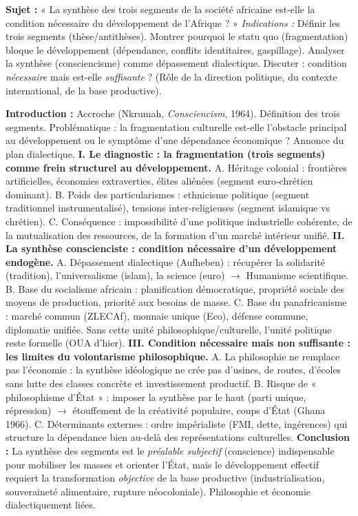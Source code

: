 \documentclass[11pt]{article}
\begin{document}
\begin{exercice}
\textbf{Sujet :} « La synthèse des trois segments de la société africaine est-elle la condition nécessaire du développement de l'Afrique ? »
\textit{Indications :} Définir les trois segments (thèse/antithèses). Montrer pourquoi le statu quo (fragmentation) bloque le développement (dépendance, conflits identitaires, gaspillage). Analyser la synthèse (consciencisme) comme dépassement dialectique. Discuter : condition \emph{nécessaire} mais est-elle \emph{suffisante} ? (Rôle de la direction politique, du contexte international, de la base productive).
\end{exercice}

\begin{corrige}
\textbf{Introduction :} Accroche (Nkrumah, \emph{Consciencism}, 1964). Définition des trois segments. Problématique : la fragmentation culturelle est-elle l'obstacle principal au développement ou le symptôme d'une dépendance économique ? Annonce du plan dialectique.
\textbf{I. Le diagnostic : la fragmentation (trois segments) comme frein structurel au développement.}
A. Héritage colonial : frontières artificielles, économies extraverties, élites aliénées (segment euro-chrétien dominant).
B. Poids des particularismes : ethnicisme politique (segment traditionnel instrumentalisé), tensions inter-religieuses (segment islamique vs chrétien).
C. Conséquence : impossibilité d'une politique industrielle cohérente, de la mutualisation des ressources, de la formation d'un marché intérieur unifié.
\textbf{II. La synthèse conscienciste : condition nécessaire d'un développement endogène.}
A. Dépassement dialectique (Aufheben) : récupérer la solidarité (tradition), l'universalisme (islam), la science (euro) $\rightarrow$ Humanisme scientifique.
B. Base du socialisme africain : planification démocratique, propriété sociale des moyens de production, priorité aux besoins de masse.
C. Base du panafricanisme : marché commun (ZLECAf), monnaie unique (Eco), défense commune, diplomatie unifiée. Sans cette unité philosophique/culturelle, l'unité politique reste formelle (OUA d'hier).
\textbf{III. Condition nécessaire mais non suffisante : les limites du volontarisme philosophique.}
A. La philosophie ne remplace pas l'économie : la synthèse idéologique ne crée pas d'usines, de routes, d'écoles sans lutte des classes concrète et investissement productif.
B. Risque de « philosophisme d'État » : imposer la synthèse par le haut (parti unique, répression) $\rightarrow$ étouffement de la créativité populaire, coups d'État (Ghana 1966).
C. Déterminants externes : ordre impérialiste (FMI, dette, ingérences) qui structure la dépendance bien au-delà des représentations culturelles.
\textbf{Conclusion :} La synthèse des segments est le \emph{préalable subjectif} (conscience) indispensable pour mobiliser les masses et orienter l'État, mais le développement effectif requiert la transformation \emph{objective} de la base productive (industrialisation, souveraineté alimentaire, rupture néocoloniale). Philosophie et économie dialectiquement liées.
\end{corrige}
\end{document}
